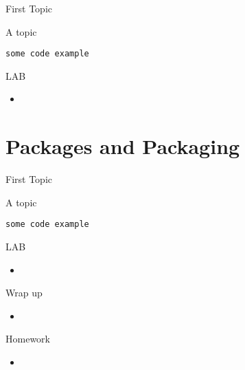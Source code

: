 \documentclass{beamer}
\begin{document}
\begin{frame}[fragile]{First Topic}

 {\Large A topic}

\begin{verbatim}
some code example
\end{verbatim}

\end{frame} 

\begin{frame}{LAB}

\begin{itemize}
  \item
\end{itemize}

\end{frame}


\section{Packages and Packaging}

\begin{frame}[fragile]{First Topic}

 {\Large A topic}

\begin{verbatim}
some code example
\end{verbatim}

\end{frame} 

\begin{frame}{LAB}

\begin{itemize}
  \item
\end{itemize}

\end{frame}

\begin{frame}{Wrap up}

\begin{itemize}
  \item
\end{itemize}

\end{frame}



\begin{frame}{Homework}

\begin{itemize}
  \item
\end{itemize}

\end{frame}
\end{document}
